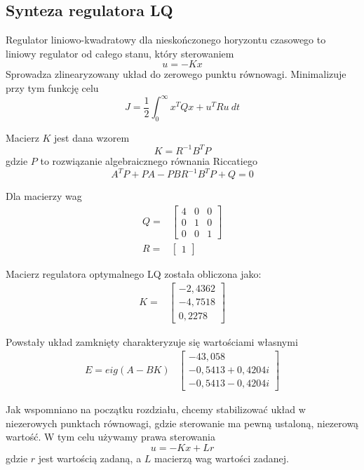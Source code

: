 \subsection{Synteza regulatora LQ}

Regulator liniowo-kwadratowy dla nieskończonego horyzontu czasowego to liniowy regulator od całego stanu, który sterowaniem
\begin{equation}
u = -Kx
\end{equation}
Sprowadza zlinearyzowany układ do zerowego punktu równowagi. Minimalizuje przy tym funkcję celu
\begin{equation}
J = \dfrac{1}{2} \int _0^{\infty} {x^T Q x + u^T R u}\: dt
\end{equation}

Macierz $K$ jest dana wzorem
\begin{equation}
K = R^{-1}B^T P
\end{equation}
gdzie $P$ to rozwiązanie algebraicznego równania Riccatiego
\begin{equation}
A^T P + PA -PBR^{-1}B^T P + Q = 0
\end{equation}

Dla macierzy wag
\[
\begin{array}{lc}
Q = &
\begin{bmatrix} 4 & 0 & 0 \\
0 & 1 & 0 \\
0 & 0 & 1
\end{bmatrix}
\\
R = & \begin{bmatrix}
1
\end{bmatrix}
\end{array}
\]
    
Macierz regulatora optymalnego LQ została obliczona jako:
\[
\begin{array}{lc}
K = &
\begin{bmatrix}
 -2,4362 \\  -4,7518  \\  0,2278
\end{bmatrix}
\end{array}
\]

Powstały układ zamknięty charakteryzuje się wartościami własnymi
\[
\begin{array}{lc}
E = eig(A-BK) &
\begin{bmatrix}
  -43,058 \\
  -0,5413 + 0,4204i \\
  -0,5413 - 0,4204i
\end{bmatrix}
\end{array}
\]

Jak wspomniano na początku rozdziału, chcemy stabilizować układ w niezerowych punktach równowagi, gdzie sterowanie ma pewną ustaloną, niezerową wartość. W tym celu używamy prawa sterowania
\begin{equation}
u = -Kx + Lr
\end{equation}
gdzie $r$ jest wartością zadaną, a $L$ macierzą wag wartości zadanej.




